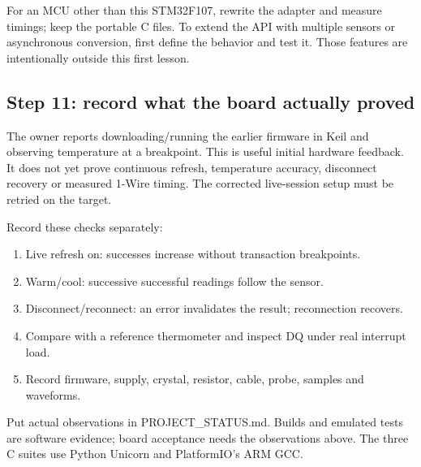 For an MCU other than this STM32F107, rewrite the adapter and measure timings; keep the portable C files. To extend the API with multiple sensors or asynchronous conversion, first define the behavior and test it. Those features are intentionally outside this first lesson.

\subsection{Step 11: record what the board actually proved}
The owner reports downloading/running the earlier firmware in Keil and observing temperature at a breakpoint. This is useful initial hardware feedback. It does not yet prove continuous refresh, temperature accuracy, disconnect recovery or measured 1-Wire timing. The corrected live-session setup must be retried on the target.

Record these checks separately:
\begin{enumerate}
\item Live refresh on: successes increase without transaction breakpoints.
\item Warm/cool: successive successful readings follow the sensor.
\item Disconnect/reconnect: an error invalidates the result; reconnection recovers.
\item Compare with a reference thermometer and inspect DQ under real interrupt load.
\item Record firmware, supply, crystal, resistor, cable, probe, samples and waveforms.
\end{enumerate}
Put actual observations in PROJECT\_STATUS.md. Builds and emulated tests are software evidence; board acceptance needs the observations above. The three C suites use Python Unicorn and PlatformIO's ARM GCC.
